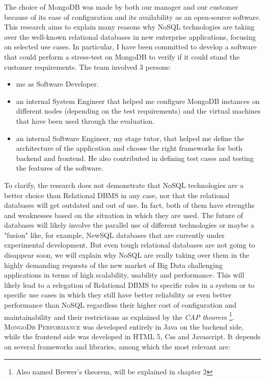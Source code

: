 The choice of MongoDB was made by both our manager and our customer because of its ease of configuration and its availability as 
an open-source software.
This research aims to explain many reasons why NoSQL technologies are taking over the well-known relational databases in new enterprise applications, focusing on selected use cases.
In particular, I have been committed to develop a software that could perform a stress-test on MongoDB to verify if it could stand the customer requirements.
The team involved 3 persons:
\begin{itemize}
  \item me as Software Developer.
  \item an internal System Engineer that helped me configure MongoDB instances on different nodes (depending on the test requirements) and the virtual machines that have been used through the evaluation.
  \item an internal Software Engineer, my stage tutor, that helped me define the architecture of the application and choose the right frameworks for both backend and frontend. He also contributed in defining test cases and testing the features of the software.
\end{itemize}
To clarify, the research does not demonstrate that NoSQL technologies are a better choice than Relational DBMS in any case, nor that the relational databases will get outdated and out of use.
In fact, both of them have strengths and weaknesses based on the situation in which they are used.
The future of databases will likely involve the parallel use of different technologies or maybe a "fusion" like, for example, NewSQL databases that are currently under experimental development.
But even tough relational databases are not going to disappear soon, we will explain why NoSQL are really taking over them in the highly demanding requests of the new market of Big Data challenging applications in terms of high scalability, usability and performance.
This will likely lead to a relegation of Relational DBMS to specific roles in a system or to specific use cases in which they still have better reliability or even better performance than NoSQL regardless their higher cost of configuration and maintainability and their restrictions as explained by the \textit{CAP theorem} \footnote{Also named Brewer's theorem, will be explained in chapter 2}.
\textsc{MongoDb Performance} was developed entirely in Java on the backend side, while the frontend side was developed in HTML 5, Css and Javascript.
It depends on several frameworks and libraries, among which the most relevant are:
